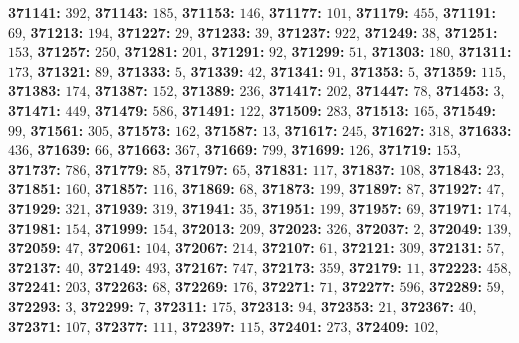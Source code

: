 \textsf{\bfseries 371141:} $392$, \textsf{\bfseries 371143:} $185$, \textsf{\bfseries 371153:} $146$, \textsf{\bfseries 371177:} $101$, \textsf{\bfseries 371179:} $455$, \textsf{\bfseries 371191:} $69$, \textsf{\bfseries 371213:} $194$, \textsf{\bfseries 371227:} $29$, \textsf{\bfseries 371233:} $39$, \textsf{\bfseries 371237:} $922$, \textsf{\bfseries 371249:} $38$, \textsf{\bfseries 371251:} $153$, \textsf{\bfseries 371257:} $250$, \textsf{\bfseries 371281:} $201$, \textsf{\bfseries 371291:} $92$, \textsf{\bfseries 371299:} $51$, \textsf{\bfseries 371303:} $180$, \textsf{\bfseries 371311:} $173$, \textsf{\bfseries 371321:} $89$, \textsf{\bfseries 371333:} $5$, \textsf{\bfseries 371339:} $42$, \textsf{\bfseries 371341:} $91$, \textsf{\bfseries 371353:} $5$, \textsf{\bfseries 371359:} $115$, \textsf{\bfseries 371383:} $174$, \textsf{\bfseries 371387:} $152$, \textsf{\bfseries 371389:} $236$, \textsf{\bfseries 371417:} $202$, \textsf{\bfseries 371447:} $78$, \textsf{\bfseries 371453:} $3$, \textsf{\bfseries 371471:} $449$, \textsf{\bfseries 371479:} $586$, \textsf{\bfseries 371491:} $122$, \textsf{\bfseries 371509:} $283$, \textsf{\bfseries 371513:} $165$, \textsf{\bfseries 371549:} $99$, \textsf{\bfseries 371561:} $305$, \textsf{\bfseries 371573:} $162$, \textsf{\bfseries 371587:} $13$, \textsf{\bfseries 371617:} $245$, \textsf{\bfseries 371627:} $318$, \textsf{\bfseries 371633:} $436$, \textsf{\bfseries 371639:} $66$, \textsf{\bfseries 371663:} $367$, \textsf{\bfseries 371669:} $799$, \textsf{\bfseries 371699:} $126$, \textsf{\bfseries 371719:} $153$, \textsf{\bfseries 371737:} $786$, \textsf{\bfseries 371779:} $85$, \textsf{\bfseries 371797:} $65$, \textsf{\bfseries 371831:} $117$, \textsf{\bfseries 371837:} $108$, \textsf{\bfseries 371843:} $23$, \textsf{\bfseries 371851:} $160$, \textsf{\bfseries 371857:} $116$, \textsf{\bfseries 371869:} $68$, \textsf{\bfseries 371873:} $199$, \textsf{\bfseries 371897:} $87$, \textsf{\bfseries 371927:} $47$, \textsf{\bfseries 371929:} $321$, \textsf{\bfseries 371939:} $319$, \textsf{\bfseries 371941:} $35$, \textsf{\bfseries 371951:} $199$, \textsf{\bfseries 371957:} $69$, \textsf{\bfseries 371971:} $174$, \textsf{\bfseries 371981:} $154$, \textsf{\bfseries 371999:} $154$, \textsf{\bfseries 372013:} $209$, \textsf{\bfseries 372023:} $326$, \textsf{\bfseries 372037:} $2$, \textsf{\bfseries 372049:} $139$, \textsf{\bfseries 372059:} $47$, \textsf{\bfseries 372061:} $104$, \textsf{\bfseries 372067:} $214$, \textsf{\bfseries 372107:} $61$, \textsf{\bfseries 372121:} $309$, \textsf{\bfseries 372131:} $57$, \textsf{\bfseries 372137:} $40$, \textsf{\bfseries 372149:} $493$, \textsf{\bfseries 372167:} $747$, \textsf{\bfseries 372173:} $359$, \textsf{\bfseries 372179:} $11$, \textsf{\bfseries 372223:} $458$, \textsf{\bfseries 372241:} $203$, \textsf{\bfseries 372263:} $68$, \textsf{\bfseries 372269:} $176$, \textsf{\bfseries 372271:} $71$, \textsf{\bfseries 372277:} $596$, \textsf{\bfseries 372289:} $59$, \textsf{\bfseries 372293:} $3$, \textsf{\bfseries 372299:} $7$, \textsf{\bfseries 372311:} $175$, \textsf{\bfseries 372313:} $94$, \textsf{\bfseries 372353:} $21$, \textsf{\bfseries 372367:} $40$, \textsf{\bfseries 372371:} $107$, \textsf{\bfseries 372377:} $111$, \textsf{\bfseries 372397:} $115$, \textsf{\bfseries 372401:} $273$, \textsf{\bfseries 372409:} $102$, 
